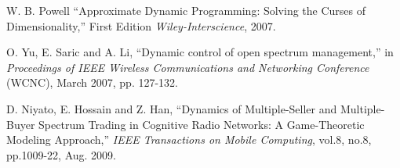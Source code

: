 \begin{thebibliography}{1}
 W. B. Powell ``Approximate Dynamic Programming: Solving the Curses of Dimensionality,'' First Edition  \emph{Wiley-Interscience}, 2007.





 O. Yu, E. Saric and A. Li, ``Dynamic control of open spectrum management,'' in \emph{Proceedings of IEEE Wireless Communications and Networking Conference} (WCNC), March
2007, pp. 127-132.




 D. Niyato, E. Hossain and Z. Han, ``Dynamics of Multiple-Seller and Multiple-Buyer Spectrum Trading in Cognitive Radio Networks: A Game-Theoretic Modeling Approach,'' \emph{ IEEE Transactions on Mobile Computing}, vol.8, no.8, pp.1009-22, Aug. 2009.


\end{thebibliography}
